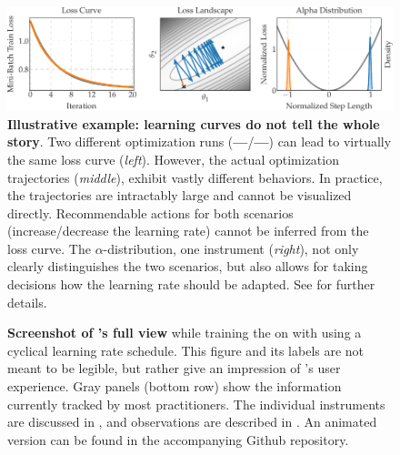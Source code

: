 \begin{figure}[!t]
  \centering
  \includegraphics{../repos/cockpit-paper/fig/02_LINE/output/LINE_thesis-wide}
  \caption{\textbf{Illustrative example: learning curves do not tell the whole
      story}. Two different optimization runs
    (\textcolor{sns_orange}{\textbf{---}}/\textcolor{sns_blue}{\textbf{---}})
    can lead to virtually the same loss curve (\textit{left}). However, the
    actual optimization trajectories (\textit{middle}), exhibit vastly different
    behaviors. In practice, the trajectories are intractably large and cannot be
    visualized directly. Recommendable actions for both scenarios
    (\textcolor{sns_orange}{increase}/\textcolor{sns_blue}{decrease} the
    learning rate) cannot be inferred from the loss curve. The
    $\alpha$-distribution, one \cockpit instrument (\textit{right}), not only
    clearly distinguishes the two scenarios, but also allows for taking
    decisions how the learning rate should be adapted. See
     for further details.}\label{cockpit::fig:LINE}
\end{figure}

\begin{figure}[!t]
  \centering
  \vspace{0.5ex}
  \caption{\textbf{Screenshot of \cockpittitle's full view} while training the
    \allcnnc \citep{springenberg2015striving} on \cifarhun with \sgd using a cyclical
    learning rate schedule. This figure and its labels are not meant to be
    legible, but rather give an impression of \cockpit's user experience. Gray
    panels (bottom row) show the information currently tracked by most
    practitioners. The individual instruments are discussed in
    , and observations are described in
    . An animated version can be found in the accompanying
    Github repository.}
  \label{cockpit::fig:showcase}
\end{figure}

